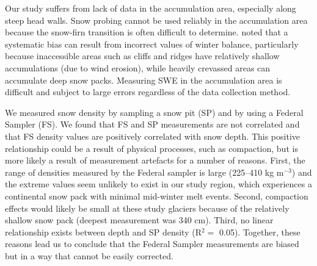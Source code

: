 \documentclass[twocolumn, letterpaper]{igs}
\begin{document}
Our study suffers from lack of data in the accumulation area, especially along steep head walls. Snow probing cannot be used reliably in the accumulation area because the snow-firn transition is often difficult to determine. \cite{Sold2013} noted that a systematic bias can result from incorrect values of winter balance, particularly because inaccessible areas such as cliffs and ridges have relatively shallow accumulations (due to wind erosion), while heavily crevassed areas can accumulate deep snow packs. Measuring SWE in the accumulation area is difficult and subject to large errors regardless of the data collection method.

We measured snow density by sampling a snow pit (SP) and by using a Federal Sampler (FS). We found that FS and SP measurements are not correlated and that FS density values are positively correlated with snow depth. This positive relationship could be a result of physical processes, such as compaction, but is more likely a result of measurement artefacts for a number of reasons. First, the range of densities measured by the Federal sampler is large (225--410 kg m$^{-3}$) and the extreme values seem unlikely to exist in our study region, which experiences a continental snow pack with minimal mid-winter melt events. Second, compaction effects would likely be small at these study glaciers because of the relatively shallow snow pack (deepest measurement was 340 cm). Third, no linear relationship exists between depth and SP density (R$^2=$ 0.05). Together, these reasons lead us to conclude that the Federal Sampler measurements are biased but in a way that cannot be easily corrected. 
\end{document}

